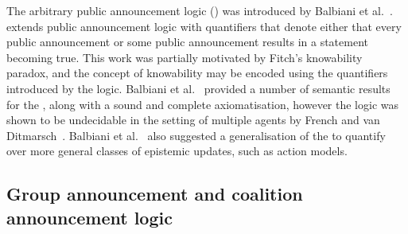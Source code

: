 The arbitrary public announcement logic (\logicApal{}) was introduced by Balbiani et al.~\cite{balbiani:2007}.
\logicApal{} extends public announcement logic with quantifiers that denote either that every public announcement or some public announcement results in a statement becoming true.
This work was partially motivated by Fitch's knowability paradox, and the concept of knowability may be encoded using the quantifiers introduced by the logic.
Balbiani et al.~\cite{balbiani:2007} provided a number of semantic results for the \logicApal{}, along with a sound and complete axiomatisation, however the logic was shown to be undecidable in the setting of multiple agents by French and van Ditmarsch~\cite{french:2008}.
Balbiani et al.~\cite{balbiani:2007} also suggested a generalisation of the \logicApal{} to quantify over more general classes of epistemic updates, such as action models.


\subsection{Group announcement and coalition announcement logic}


